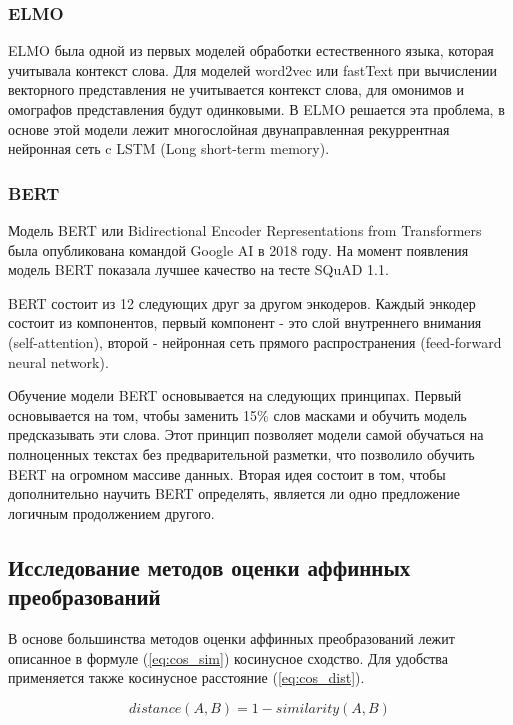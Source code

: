 \documentclass[a4paper,14pt]{article}
\begin{document}
	\subsubsection{ELMO}
	
	ELMO была одной из первых моделей обработки естественного языка, которая учитывала контекст слова.
	Для моделей word2vec или fastText при вычислении векторного представления не учитывается контекст слова, для омонимов и омографов представления будут одинковыми.
	В ELMO решается эта проблема, в основе этой модели лежит многослойная двунаправленная рекуррентная нейронная сеть c LSTM (Long short-term memory).
	
	\subsubsection{BERT}
	
	Модель BERT или Bidirectional Encoder Representations from Transformers была опубликована командой Google AI в 2018 году.
	На момент появления модель BERT показала лучшее качество на тесте SQuAD 1.1.
	
	BERT состоит из 12 следующих друг за другом энкодеров.
	Каждый энкодер состоит из компонентов, первый компонент - это слой внутреннего внимания (self-attention), второй - нейронная сеть прямого распространения (feed-forward neural network).
	
	Обучение модели BERT основывается на следующих принципах.	
	Первый основывается на том, чтобы заменить 15\% слов масками и обучить модель предсказывать эти слова.
	Этот принцип позволяет модели самой обучаться на полноценных текстах без предварительной разметки, что позволило обучить BERT на огромном массиве данных.
	Вторая идея состоит в том, чтобы дополнительно научить BERT определять, является ли одно предложение логичным продолжением другого.
	
	\subsection{Исследование методов оценки аффинных преобразований}
	
	В основе большинства методов оценки аффинных преобразований лежит описанное в формуле (\ref{eq:cos_sim}) косинусное сходство.
	Для удобства применяется также косинусное расстояние (\ref{eq:cos_dist}).
	
	\begin{equation}
		distance(A,B) = 1 - similarity(A,B)
		\label{eq:cos_dist}
	\end{equation}
\end{document}
